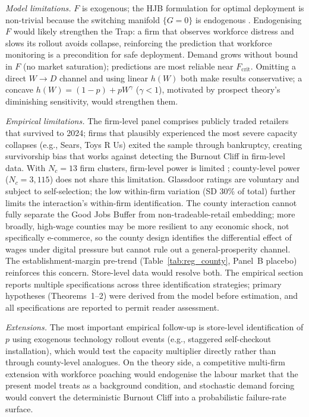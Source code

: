 \documentclass[msom,dblanonrev]{informs4}
\begin{document}
\textit{Model limitations.} $F$ is exogenous; the HJB formulation for optimal deployment is non-trivial because the switching manifold $\{G{=}0\}$ is endogenous \citep{filippov1988differential}. Endogenising $F$ would likely strengthen the Trap: a firm that observes workforce distress and slows its rollout avoids collapse, reinforcing the prediction that workforce monitoring is a precondition for safe deployment. Demand grows without bound in $F$ (no market saturation); predictions are most reliable near $F_{\mathrm{crit}}$. Omitting a direct $W \to D$ channel and using linear $h(W)$ both make results conservative; a concave $h(W) = (1{-}p)+pW^\gamma$ ($\gamma < 1$), motivated by prospect theory's diminishing sensitivity, would strengthen them.

\textit{Empirical limitations.} The firm-level panel comprises publicly traded retailers that survived to 2024; firms that plausibly experienced the most severe capacity collapses (e.g., Sears, Toys R Us) exited the sample through bankruptcy, creating survivorship bias that works against detecting the Burnout Cliff in firm-level data. With $N_c = 13$ firm clusters, firm-level power is limited \citep{cameron2008bootstrap}; county-level power ($N_c = 3{,}115$) does not share this limitation. Glassdoor ratings are voluntary and subject to self-selection; the low within-firm variation (SD 30\% of total) further limits the interaction's within-firm identification. The county interaction cannot fully separate the Good Jobs Buffer from non-tradeable-retail embedding; more broadly, high-wage counties may be more resilient to any economic shock, not specifically e-commerce, so the county design identifies the differential effect of wages under digital pressure but cannot rule out a general-prosperity channel. The establishment-margin pre-trend (Table~\ref{tab:reg_county}, Panel~B placebo) reinforces this concern. Store-level data would resolve both. The empirical section reports multiple specifications across three identification strategies; primary hypotheses (Theorems~1--2) were derived from the model before estimation, and all specifications are reported to permit reader assessment.

\textit{Extensions.} The most important empirical follow-up is store-level identification of $p$ using exogenous technology rollout events (e.g., staggered self-checkout installation), which would test the capacity multiplier directly rather than through county-level analogues. On the theory side, a competitive multi-firm extension with workforce poaching would endogenise the labour market that the present model treats as a background condition, and stochastic demand forcing would convert the deterministic Burnout Cliff into a probabilistic failure-rate surface.
\end{document}
